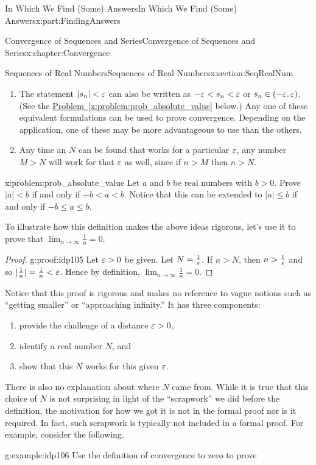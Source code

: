 \begin{partptx}{In Which We Find (Some) Answers}{}{In Which We Find (Some) Answers}{}{}{x:part:FindingAnswers}
\begin{chapterptx}{Convergence of Sequences and Series}{}{Convergence of Sequences and Series}{}{}{x:chapter:Convergence}
\begin{sectionptx}{Sequences of Real Numbers}{}{Sequences of Real Numbers}{}{}{x:section:SeqRealNum}
\begin{enumerate}
				\item{}The statement \(|s_n|< \varepsilon\) can also be written as \(-\varepsilon< s_n< \varepsilon\) or \(s_n\in\left(-\varepsilon,\varepsilon\right)\). (See the \hyperref[x:problem:prob_absolute_value]{Problem~{\xreffont\ref{x:problem:prob_absolute_value}}} below.) Any one of these equivalent formulations can be used to prove convergence. Depending on the application, one of these may be more advantageous to use than the others.%
				\item{}Any time an \(N\) can be found that works for a particular \(\varepsilon\), any number \(M>N\) will work for that \(\varepsilon\) as well, since if \(n>M\) then \(n>N\).%
			\end{enumerate}
			\begin{problem}{}{x:problem:prob_absolute_value}%
				 Let \(a\) and \(b\) be real numbers with \(b>0\). Prove \(|a|\lt b\) if and only if \(-b\lt a\lt b\). Notice that this can be extended to \(|a|\leq b\) if and only if \(-b\leq a\leq b\).%
			\end{problem}
			To illustrate how this definition makes the above ideas rigorous, let's use it to prove that \(\displaystyle\lim_{n\rightarrow\infty}\frac{1}{n}=0\).%
			\begin{proof}{}{g:proof:idp105}
				Let \(\varepsilon>0\) be given. Let \(N=\frac{1}{\varepsilon}\). If \(n>N\), then \(n>\frac{1}{\varepsilon}\) and so \(|\frac{1}{n}|=\frac{1}{n}< \varepsilon\). Hence by definition, \(\lim_{n\rightarrow\infty}\frac{1}{n}=0\).%
			\end{proof}
			Notice that this proof is rigorous and makes no reference to vague notions such as ``getting smaller'' or ``approaching infinity.'' It has three components:%
			\begin{enumerate}
				\item{}provide the challenge of a distance \(\varepsilon>0\),%
				\item{}identify a real number \(N\), and%
				\item{}show that this \(N\) works for this given \(\varepsilon\).%
			\end{enumerate}
			There is also no explanation about where \(N\) came from. While it is true that this choice of \(N\) is not surprising in light of the ``scrapwork'' we did before the definition, the motivation for how we got it is not in the formal proof nor is it required.  In fact, such scrapwork is typically not included in a formal proof.  For example, consider the following.%
			\begin{example}{}{g:example:idp106}%
				Use the definition of convergence to zero to prove%

\end{example}
\end{sectionptx}
\end{chapterptx}
\end{partptx}
